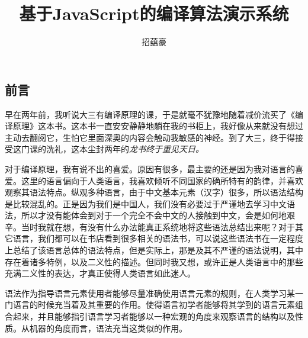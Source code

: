 \documentclass[12pt,leqno]{book}
\begin{document}
\begin{CJK}{UTF8}{gbsn}

\title{\bf{基于JavaScript的编译算法演示系统}}
\author{招蕴豪}
\maketitle

\tableofcontents
{}

\chapter*{前言}
\pagestyle{plain}

早在两年前，我听说大三有编译原理的课，于是就毫不犹豫地随着减价流买了《编译原理》这本书。这本书一直安安静静地躺在我的书柜上，我好像从来就没有想过主动去翻阅它，生怕它里面深奥的内容会触动我敏感的神经。到了大三，终于得接受这门课的洗礼，这本尘封两年的\em{龙书}终于重见天日。

对于编译原理，我有说不出的喜爱。原因有很多，最主要的还是因为我对语言的喜爱。这里的语言偏向于人类语言，我喜欢倾听不同国家的确所特有的韵律，并喜欢观察其语法特点。纵观多种语言，由于中文基本元素（汉字）很多，所以语法结构是比较混乱的。正是因为我们是中国人，我们没有必要过于严谨地去学习中文语法，所以才没有能体会到对于一个完全不会中文的人接触到中文，会是如何地艰辛。当时我就在想，有没有什么办法能真正系统地将这些语法总结出来呢？对于其它语言，我们都可以在书店看到很多相关的语法书，可以说这些语法书在一定程度上总结了该语言总体的语法特点，但是实际上，那是及其不严谨的语法说明，其中存在着诸多特例，以及二义性的描述。但同时我又想，或许正是人类语言中的那些充满二义性的表达，才真正使得人类语言如此迷人。

语法作为指导语言元素使用者能够尽量准确使用语言元素的规则，在人类学习某一门语言的时候充当着及其重要的作用。使得语言初学者能够将其学到的语言元素组合起来，并且能够指引语言学习者能够以一种宏观的角度来观察语言的结构以及性质。从机器的角度而言，语法充当这类似的作用。




\end{CJK}
\end{document}
